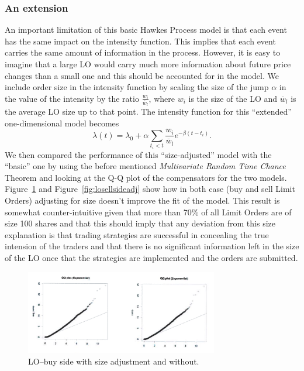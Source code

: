 \subsubsection{An extension}


An important limitation of this basic Hawkes Process model is that each event has the same impact on the intensity function. This implies that each event carries the same amount of information in the process. However, it is easy to imagine that a large LO would carry much more information about future price changes than a small one and this should be accounted for in the model. We include order size in the intensity function by scaling the size of the jump $\alpha$ in the value of the intensity by the ratio $\frac{w_i}{\overline{w}_l}$, where $w_i$ is the size of the LO and $\overline{w}_l$ is the average LO size up to that point. The intensity function for this ``extended'' one-dimensional model becomes
	\[
	\lambda(t)= \lambda_0 + \alpha \sum_{t_i<t} \dfrac{w_i}{\overline{w}_l} e^{-\beta(t-t_i)}.
	\]
We then compared the performance of this ``size-adjusted'' model with the ``basic'' one by using the before mentioned \emph{Multivariate Random Time Chance} Theorem and looking at the Q-Q plot of the compensators for the two models. Figure~\ref{fig:lobuysideadj} and Figure~\ref{fig:losellsideadj} show how in both case (buy and sell Limit Orders) adjusting for size doesn't improve the fit of the model. This result is somewhat counter-intuitive given that more than 70\% of all Limit Orders are of size 100 shares and that this should imply that any deviation from this size explanation is that trading strategies are successful in concealing the true intension of the traders and that there is no significant information left in the size of the LO once that the strategies are implemented and the orders are submitted. 
	\begin{figure}[!ht]
   	\centering
   	\includegraphics[width=0.75\textwidth]{chapters/chapter_trade_data_models/figures/lobuysideadj.png} 
   	\caption{LO--buy side with size adjustment and without. \label{fig:lobuysideadj}}
	\end{figure}
